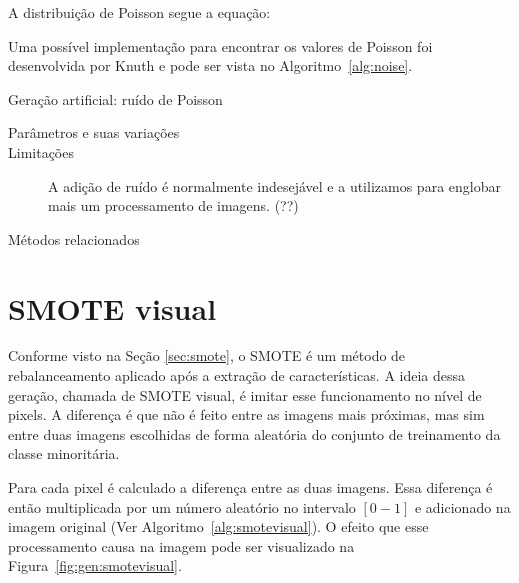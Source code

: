 
A distribuição de Poisson segue a equação:


Uma possível implementação para encontrar os valores de Poisson foi desenvolvida por Knuth e pode ser vista no Algoritmo~\ref{alg:noise}.

\vspace{0.5cm}
\begin{algorithm}[!htbp]
  \caption{Geração artificial: ruído de Poisson}
  \label{alg:noise}
  \SetAlgoLined
\end{algorithm}
\vspace{0.5cm}

\begin{description}
  \item[Parâmetros e suas variações]
  \item[Limitações] A adição de ruído é normalmente indesejável e a utilizamos
  para englobar mais um processamento de imagens. (??)
  \item[Métodos relacionados]
\end{description}
\section{SMOTE visual}

Conforme visto na Seção \ref{sec:smote}, o SMOTE é um método de rebalanceamento aplicado após a extração de características. A ideia dessa geração, chamada de SMOTE visual, é imitar esse funcionamento no nível de pixels. A diferença é que não é feito entre as imagens mais próximas, mas sim entre duas imagens escolhidas de forma aleatória do conjunto de treinamento da classe minoritária.

Para cada pixel é calculado a diferença entre as duas imagens. Essa diferença é então multiplicada por um número aleatório no intervalo $[0-1]$ e adicionado
na imagem original (Ver Algoritmo~\ref{alg:smotevisual}). O efeito que esse processamento causa na imagem pode ser visualizado na Figura~\ref{fig:gen:smotevisual}.

